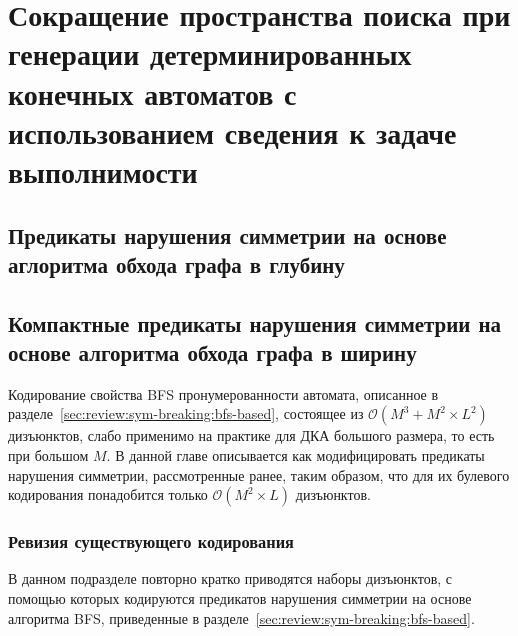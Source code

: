 
\chapter{Сокращение пространства поиска при генерации детерминированных конечных автоматов с использованием сведения к задаче выполнимости}
\label{sec:space}


\section{Предикаты нарушения симметрии на основе аглоритма обхода графа в глубину}
\label{sec:space:dfs}


\section{Компактные предикаты нарушения симметрии на основе алгоритма обхода графа в ширину} 
\label{sec:space:tight}

Кодирование свойства BFS пронумерованности автомата, описанное в разделе~\ref{sec:review:sym-breaking:bfs-based}, состоящее из $\mathcal{O}\left(M^{3} + M^{2} \times L^{2}\right)$ дизъюнктов, слабо применимо на практике для ДКА большого размера, то есть при большом $M$. 
В данной главе описывается как модифицировать предикаты нарушения симметрии, рассмотренные ранее, таким образом, что для их булевого кодирования понадобится только $\mathcal{O}\left(M^{2} \times L\right)$ дизъюнктов.



\subsection{Ревизия существующего кодирования}
\label{sec:space:tight:review}

В данном подразделе повторно кратко приводятся наборы дизъюнктов, с помощью которых кодируются предикатов нарушения симметрии на основе алгоритма BFS, приведенные в разделе~\ref{sec:review:sym-breaking:bfs-based}.

